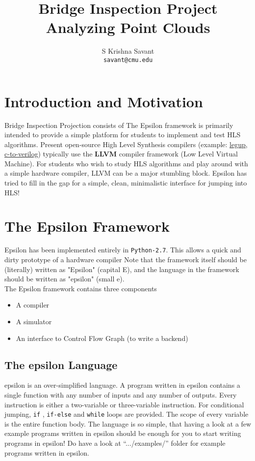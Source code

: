 \documentclass[titlepage]{article}
\title{Bridge Inspection Project\\[1cm]\textbf{Analyzing Point Clouds}\\[1cm]}
\author{S Krishna Savant\\
        \texttt{savant@cmu.edu}\\
        }
\begin{document}
\maketitle
\tableofcontents

\section{Introduction and Motivation}
        Bridge Inspection Projection consists of 
    The Epsilon framework is primarily intended to provide a simple platform for students to implement and test HLS algorithms.
    Present open-source High Level Synthesis compilers (example: \href{http://legup.eecg.utoronto.ca}{legup}, \href{http://c-to-verilog.com}{c-to-verilog}) typically use the \textbf{LLVM} compiler framework (Low Level Virtual Machine). For students who wish to study HLS algorithms and play around with a simple hardware compiler, LLVM can be a major stumbling block. Epsilon has tried to fill in the gap for a simple, clean, minimalistic interface for jumping into HLS!
    
\section{The Epsilon Framework}
    Epsilon has been implemented entirely in \texttt{Python-2.7}. This allows a quick and dirty prototype of a hardware compiler
    Note that the framework itself should be (literally) written as "Epsilon" (capital E), and the language in the framework should be written as "epsilon" (small e).\\
    The Epsilon framework contains three components
    \begin{itemize}
    \item A compiler
    \item A simulator
    \item An interface to Control Flow Graph (to write a backend)
    \end{itemize}
\subsection{The epsilon Language}
    epsilon is an over-simplified language. A program written in epsilon contains a single function with any number of inputs
    and any number of outputs. Every instruction is either a two-variable or three-variable instruction.
    For conditional jumping, \texttt{if} ,  \texttt{if-else} and \texttt{while} loops are provided. The scope of every variable is the entire function body.
    The language is so simple, that having a look at a few example programs written in epsilon should be enough for you to start writing
    programs in epsilon! Do have a look at \textsf{``.../examples/''} folder for example programs written in epsilon.
\end{document}
